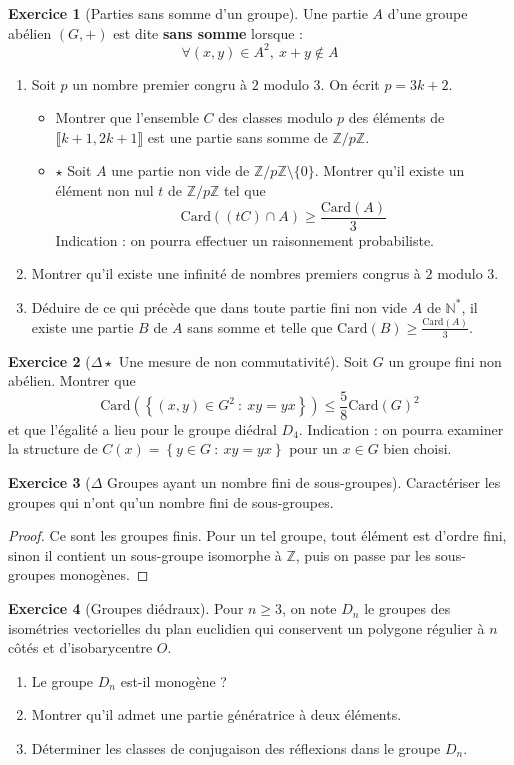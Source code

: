 \documentclass[french]{book}
\newcommand{\N}{\mathbb{N}}
\newcommand{\Z}{\mathbb{Z}}
\newcommand{\st}{^*}
\newcommand{\card}{\text{Card}}
\theoremstyle{definition}
\newtheorem{ex}{Exercice}[chapter]
\theoremstyle{theorem}
\theoremstyle{remark}
\begin{document}
\begin{ex}[Parties sans somme d'un groupe]
	Une partie $A$ d'une groupe abélien $(G,+)$ est dite \textbf{sans somme} lorsque : $$\forall (x,y)\in A^2,\ x+y\notin A$$
	\begin{enumerate}
		\item Soit $p$ un nombre premier congru à $2$ modulo $3$. On écrit $p=3k+2$.
		\begin{itemize}
			\item Montrer que l'ensemble $C$ des classes modulo $p$ des éléments de $\llbracket k+1,2k+1\rrbracket$ est une partie sans somme de $\Z/p\Z$.
			\item $\star$ Soit $A$ une partie non vide de $\Z/p\Z\setminus\{0\}$. Montrer qu'il existe un élément non nul $t$ de $\Z/p\Z$ tel que $$\card((tC)\cap A)\geqslant\frac{\card(A)}{3}$$ Indication : on pourra effectuer un raisonnement probabiliste.
		\end{itemize}
		\item Montrer qu'il existe une infinité de nombres premiers congrus à $2$ modulo $3$.
		\item Déduire de ce qui précède que dans toute partie fini non vide $A$ de $\N\st$, il existe une partie $B$ de $A$ sans somme et telle que $\displaystyle\card(B)\geqslant\frac{\card(A)}{3}$.
	\end{enumerate}
\end{ex}

\begin{ex}[$\Delta\star$ Une mesure de non commutativité]
	Soit $G$ un groupe fini non abélien. Montrer que $$\card\left(\left\{(x,y)\in G^2\ : \ xy=yx\right\}\right)\leqslant\frac{5}{8}\card(G)^2$$ et que l'égalité a lieu pour le groupe diédral $D_4$. Indication : on pourra examiner la structure de $C(x)=\left\{y\in G\ : \ xy=yx\right\}$ pour un $x\in G$ bien choisi.
\end{ex}

\begin{ex}[$\Delta$ Groupes ayant un nombre fini de sous-groupes]
	Caractériser les groupes qui n'ont qu'un nombre fini de sous-groupes.
\end{ex}

\begin{proof}
	Ce sont les groupes finis. Pour un tel groupe, tout élément est d'ordre fini, sinon il contient un sous-groupe isomorphe à $\Z$, puis on passe par les sous-groupes monogènes.
\end{proof}

\begin{ex}[Groupes diédraux]
	Pour $n\geqslant 3$, on note $D_n$ le groupes des isométries vectorielles du plan euclidien qui conservent un polygone régulier à $n$ côtés et d'isobarycentre $O$.
	\begin{enumerate}
		\item Le groupe $D_n$ est-il monogène ?
		\item Montrer qu'il admet une partie génératrice à deux éléments.
		\item Déterminer les classes de conjugaison des réflexions dans le groupe $D_n$.
	\end{enumerate}
\end{ex}
\end{document}
